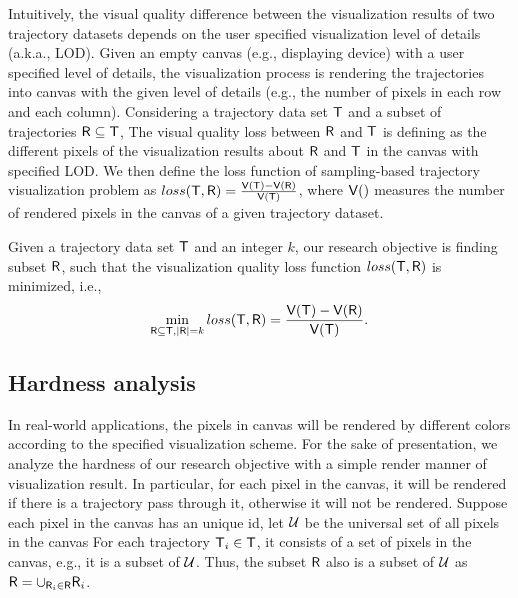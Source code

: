 Intuitively, the visual quality difference between the visualization results of two trajectory datasets depends on the user specified visualization level of details (a.k.a., LOD).
Given an empty canvas (e.g., displaying device) with a user specified level of details,
the visualization process is rendering the trajectories into canvas with the given level of details (e.g., the number of pixels in each row and each column).
Considering a trajectory data set $\mathsf{T}$ and a subset of trajectories $\mathsf{R} \subseteq \mathsf{T}$,
The visual quality loss between $\mathsf{R}$ and $\mathsf{T}$ is defining as the different pixels of the visualization results about $\mathsf{R}$ and $\mathsf{T}$ in the canvas with specified LOD.
We then define the loss function of sampling-based trajectory visualization problem as $loss(\mathsf{T}, \mathsf{R}) = \frac{\mathsf{V}(\mathsf{T}) - \mathsf{V}(\mathsf{R})}{\mathsf{V}(\mathsf{T})}$,
where $\mathsf{V}()$ measures the number of rendered pixels in the canvas of a given trajectory dataset.

Given a trajectory data set $\mathsf{T}$ and an integer $k$,  our research objective is finding subset $\mathsf{R}$, such that  the visualization quality loss function $loss(\mathsf{T}, \mathsf{R})$ is minimized,
i.e.,
$$ \min_{\mathsf{R} \subseteq \mathsf{T}, |\mathsf{R}| = k}  loss(\mathsf{T}, \mathsf{R}) =  \frac{\mathsf{V}(\mathsf{T}) - \mathsf{V}(\mathsf{R})}{\mathsf{V}(\mathsf{T})}. $$ %






\subsection{Hardness analysis}
In real-world applications, the pixels in canvas will be rendered by different colors according to the specified visualization scheme.
For the sake of presentation, we analyze the hardness of our research objective with a simple render manner of visualization result.
In particular, for each pixel in the canvas, it will be rendered if there is a trajectory pass through it, otherwise it will not be rendered.
Suppose each pixel in the canvas has an unique id, let $\mathcal{U}$ be the universal set of all pixels in the canvas
For each trajectory $\mathsf{T}_i \in \mathsf{T}$, it consists of a set of pixels in the canvas, e.g., it is a subset of $\mathcal{U}$.
Thus, the subset $\mathsf{R}$ also is a subset of $\mathcal{U}$ as $\mathsf{R} = \cup_{\mathsf{R}_i \in \mathsf{R}} \mathsf{R}_i$.

